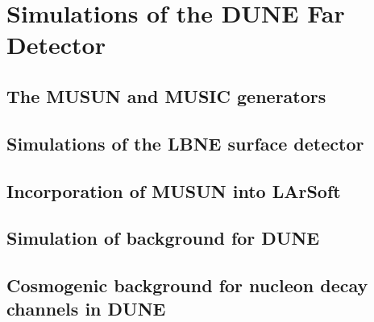 
\chapter{Simulations of the DUNE Far Detector}  %

\ifpdf
    \graphicspath{{FarDetectorSimulations/Figs/Raster/}{FarDetectorSimulations/Figs/PDF/}{FarDetectorSimulations/Figs/}}
\else
    \graphicspath{{FarDetectorSimulations/Figs/Vector/}{FarDetectorSimulations/Figs/}}
\fi

\section{The MUSUN and MUSIC generators} %

\section{Simulations of the LBNE surface detector} %

\section{Incorporation of MUSUN into LArSoft} \label{sec:FDIncorporation}  %

\section{Simulation of background for DUNE}  %

\section{Cosmogenic background for nucleon decay channels in DUNE}  %

